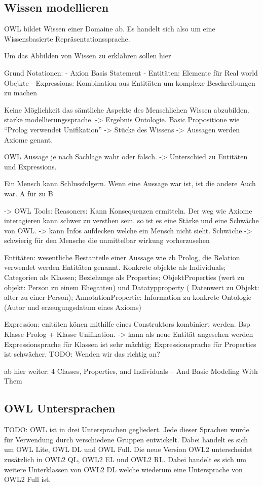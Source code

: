 \subsection{Wissen modellieren}
\label{subsec:owlRdf_owl_wissenModellieren}
OWL bildet Wissen einer Domaine ab. Es handelt sich also um eine Wissensbasierte Repräsentationssprache.

Um das Abbilden von Wissen zu erklähren sollen hier

Grund Notationen:
- Axion Basis Statement 
- Entitäten: Elemente für Real world Obejkte
- Expressions: Kombination aus Entitäten um komplexe Beschreibungen zu machen


Keine Möglichkeit das sämtliche Aspekte des Menschlichen Wissen abzubilden. starke modellierungssprache. -> Ergebnis Ontologie.
Basic Propositione wie "`Prolog verwendet Unifikation"' -> Stücke des Wissens -> Aussagen werden Axiome genant.

OWL Aussage je nach Sachlage wahr oder falsch. -> Unterschied zu Entitäten und Expressions.

Ein Mensch kann Schlussfolgern. Wenn eine Aussage war ist, ist die andere Auch war. A für zu B

-> OWL Tools: Reasoners: Kann Konsequenzen ermitteln. Der weg wie Axiome interagieren kann schwer zu versthen sein. so ist es eine Stärke und eine Schwäche von OWL. -> kann Infos aufdecken welche ein Mensch nicht sieht. Schwäche -> schwierig für den Mensche die unmittelbar wirkung vorherzusehen

Entitäten:
 wesentliche Bestanteile einer Aussage wie zb Prolog, die Relation verwendet werden Entitäten genannt. Konkrete objekte als Individuals; Categorien als Klassen; Beziehunge als Properties; ObjektProperties (wert zu objekt: Person zu einem Ehegatten) und Datatypproperty ( Datenwert zu Objekt: alter zu einer Person); AnnotationPropertie: Information zu konkrete Ontologie (Autor und erzeugungsdatum eines Axioms)

Expression: 
enitäten könen mithilfe eines Construktors kombiniert werden. Bsp Klasse Prolog + Klasse Unifikation.
-> kann als neue Entität angesehen werden
Expressionsprache für Klassen ist sehr mächtig; Expressionsprache für Properties ist schwächer. TODO: Wenden wir das richtig an?

ab hier weiter: 4 Classes, Properties, and Individuals – And Basic Modeling With Them



\subsection{OWL Untersprachen}
\label{subsec:owlRdf_owl_Untersprachen}
TODO: OWL ist in drei Untersprachen gegliedert. Jede dieser Sprachen wurde für Verwendung durch verschiedene Gruppen entwickelt. Dabei handelt es sich um OWL Lite, OWL DL und OWL Full. Die neue Version OWL2 unterscheidet zusätzlich in OWL2 QL, OWL2 EL und OWL2 RL. Dabei handelt es sich um weitere Unterklassen von OWL2 DL welche wiederum eine Untersprache von OWL2 Full ist.





